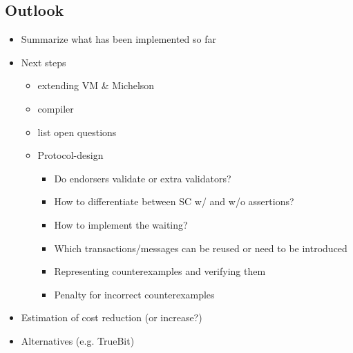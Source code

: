 
\subsection{Outlook}

\draft{}
\begin{itemize}
\item Summarize what has been implemented so far
\item Next steps
	\begin{itemize}
	\item extending VM \& Michelson
	\item compiler
	\item list open questions
	\item Protocol-design
		\begin{itemize}
		\item Do endorsers validate or extra validators?
		\item How to differentiate between SC w/ and w/o assertions?
		\item How to implement the waiting?
		\item Which transactions/messages can be reused or need to be introduced
		\item Representing counterexamples and verifying them
		\item Penalty for incorrect counterexamples
		\end{itemize}
	\end{itemize}
\item Estimation of cost reduction (or increase?)
\item Alternatives (e.g. TrueBit)
\end{itemize}